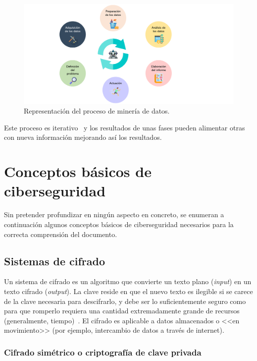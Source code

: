 \begin{figure}[h]
	\caption[Proceso de minería de datos]{Representación del proceso de minería de datos.}
	\label{img:proceso_mineria}
	\centering
	\includegraphics[scale=0.5]{../img/memoria/3_ML_phases.pdf}
\end{figure}


Este proceso es iterativo~\cite{apuntesMineria} y los resultados de unas fases pueden alimentar otras con nueva información mejorando así los resultados.


\section{Conceptos básicos de ciberseguridad}

Sin pretender profundizar en ningún aspecto en concreto, se enumeran a continuación algunos conceptos básicos de ciberseguridad necesarios para la correcta comprensión del documento.

\subsection{Sistemas de cifrado}

Un sistema de cifrado es un algoritmo que convierte un texto plano (\textit{input}) en un texto cifrado (\textit{output}). La clave reside en que el nuevo texto es ilegible si se carece de la clave necesaria para descifrarlo, y debe ser lo suficientemente seguro como para que romperlo requiera una cantidad extremadamente grande de recursos (generalmente, tiempo)~\cite{cifradoAvast}. El cifrado es aplicable a datos almacenados o <<en movimiento>> (por ejemplo, intercambio de datos a través de internet).

\subsubsection{Cifrado simétrico o criptografía de clave privada}

